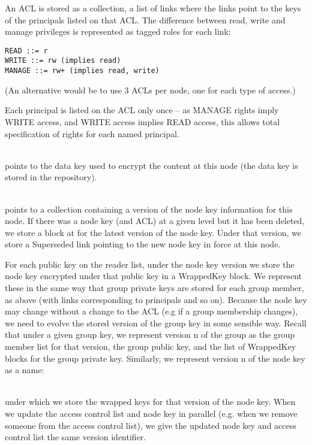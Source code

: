 An ACL is stored as a collection, a list of links where the links
point to the keys of the principals listed on that ACL. The difference
between read, write and manage privileges is represented as tagged
roles for each link:

\begin{verbatim}
READ ::= r 
WRITE ::= rw (implies read) 
MANAGE ::= rw+ (implies read, write) 
\end{verbatim}

(An alternative would be to use 3 ACLs per node, one for each type of access.)

Each principal is listed on the ACL only once -- as MANAGE rights imply WRITE access, and WRITE access implies READ access, this allows total specification of rights for each named principal.

\\
points to the data key used to encrypt the content at this node (the
data key is stored in the repository).

\\
points to a collection containing a version of the node key
information for this node. If there was a node key (and ACL) at a
given level but it has been deleted, we store a block at
 for the latest version of the node
key. Under that version, we store a Superseded link pointing to the
new node key in force at this node.

For each public key on the reader list, under the node key version we
store the node key encrypted under that public key in a WrappedKey
block. We represent these in the same way that group private keys are
stored for each group member, as above (with links corresponding to
principals and so on). Because the node key may change without a
change to the ACL (e.g if a group membership changes), we need to
evolve the stored version of the group key in some sensible
way. Recall that under a given group key, we represent version n of
the group as the group member list for that version, the group public
key, and the list of WrappedKey blocks for the group private
key. Similarly, we represent version n of the node key as a name:

\\
under which we store the wrapped keys for that version of the node
key. When we update the access control list and node key in parallel
(e.g. when we remove someone from the access control list), we give
the updated node key and access control list the same version
identifier.

